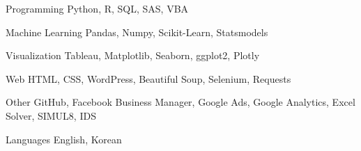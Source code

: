 

\begin{cvskills}
    \cvskill
        {Programming}
        {Python, R, SQL, SAS, VBA}

    \cvskill
        {Machine Learning}
        {Pandas, Numpy, Scikit-Learn, Statsmodels}

    \cvskill
        {Visualization}
        {Tableau, Matplotlib, Seaborn, ggplot2, Plotly}

    \cvskill
        {Web} 
        {HTML, CSS, WordPress, Beautiful Soup, Selenium, Requests}

    \cvskill
        {Other} 
        {GitHub, Facebook Business Manager, Google Ads, Google Analytics, Excel Solver, SIMUL8, IDS}

    \cvskill
        {Languages} 
        {English, Korean}

\end{cvskills}
